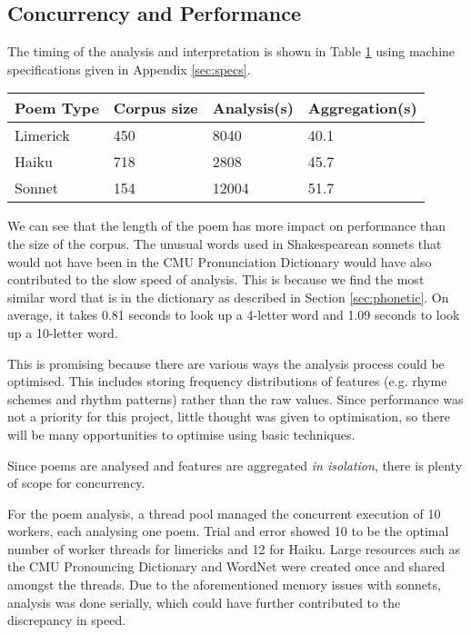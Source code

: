 \subsection{Concurrency and Performance}
\label{sec:interpret-perf}
The timing of the analysis and interpretation is shown in Table \ref{ana-agg-speed} using machine specifications given in Appendix \ref{sec:specs}.

\begin{table}
    \begin{tabular}{|l|l|l|l|}
    \hline
    Poem Type & Corpus size & Analysis(s) & Aggregation(s) \\ \hline
    Limerick  & 450         & 8040        & 40.1           \\ \hline
    Haiku     & 718         & 2808        & 45.7           \\ \hline
    Sonnet    & 154         & 12004       & 51.7           \\ \hline
    \end{tabular}
    \label{ana-agg-speed}
\end{table}

We can see that the length of the poem has more impact on performance than the size of the corpus. The unusual words used in Shakespearean sonnets that would not have been in the CMU Pronunciation Dictionary would have also contributed to the slow speed of analysis. This is because we find the most similar word that is in the dictionary as described in Section \ref{sec:phonetic}. On average, it takes 0.81 seconds to look up a 4-letter word and 1.09 seconds to look up a 10-letter word.

This is promising because there are various ways the analysis process could be optimised. This includes storing frequency distributions of features (e.g. rhyme schemes and rhythm patterns) rather than the raw values. Since performance was not a priority for this project, little thought was given to optimisation, so there will be many opportunities to optimise using basic techniques.

Since poems are analysed and features are aggregated \textit{in isolation}, there is plenty of scope for concurrency.

For the poem analysis, a thread pool managed the concurrent execution of 10 workers, each analysing one poem. Trial and error showed 10 to be the optimal number of worker threads for limericks and 12 for Haiku. Large resources such as the CMU Pronouncing Dictionary and WordNet were created once and shared amongst the threads. Due to the aforementioned memory issues with sonnets, analysis was done serially, which could have further contributed to the discrepancy in speed.

